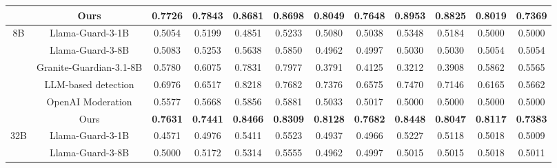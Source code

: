 \begin{table*}[th]
{\begin{tabular}{cc|cc|cc|cc|cc|cc}
                       & Ours                    & \textbf{0.7726}   & \textbf{0.7843}   & \textbf{0.8681}       & \textbf{0.8698}      & \textbf{0.8049} & \textbf{0.7648} & \textbf{0.8953}  & \textbf{0.8825} & \textbf{0.8019} & \textbf{0.7369} \\\midrule
\multirow{6}{*}{8B}    & Llama-Guard-3-1B        & 0.5054            & 0.5199            & 0.4851                & 0.5233               & 0.5080          & 0.5038          & 0.5348           & 0.5184          & 0.5000          & 0.5000          \\
                       & Llama-Guard-3-8B        & 0.5083            & 0.5253            & 0.5638                & 0.5850               & 0.4962          & 0.4997          & 0.5030           & 0.5030          & 0.5054          & 0.5054          \\
                       & Granite-Guardian-3.1-8B & 0.5780            & 0.6075            & 0.7831                & 0.7977               & 0.3791          & 0.4125          & 0.3212           & 0.3908          & 0.5862          & 0.5565          \\
                       & LLM-based detection     & 0.6976            & 0.6517            & 0.8218                & 0.7682               & 0.7376          & 0.6575          & 0.7470           & 0.7146          & 0.6165          & 0.5662          \\
                       & OpenAI Moderation       & 0.5577            & 0.5668            & 0.5856                & 0.5881               & 0.5033          & 0.5017          & 0.5000           & 0.5000          & 0.5000          & 0.5000          \\
                       & Ours                    & \textbf{0.7631}   & \textbf{0.7441}   & \textbf{0.8466}       & \textbf{0.8309}      & \textbf{0.8128} & \textbf{0.7682} & \textbf{0.8448}  & \textbf{0.8047} & \textbf{0.8117} & \textbf{0.7383} \\\midrule
\multirow{6}{*}{32B}   & Llama-Guard-3-1B        & 0.4571            & 0.4976            & 0.5411                & 0.5523               & 0.4937          & 0.4966          & 0.5227           & 0.5118          & 0.5018          & 0.5009          \\
                       & Llama-Guard-3-8B        & 0.5000            & 0.5172            & 0.5314                & 0.5555               & 0.4962          & 0.4997          & 0.5015           & 0.5015          & 0.5018          & 0.5011          \\

\end{tabular}}
\end{table*}
